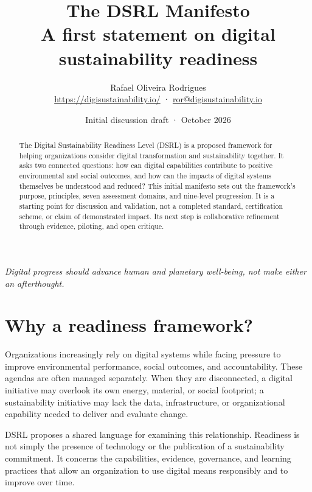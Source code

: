 \documentclass[11pt,a4paper]{article}
\title{\vspace{-1.4cm}\Huge\bfseries\color{dsrlgreen}The DSRL Manifesto\\[0.4em]
\Large\normalfont\color{black}A first statement on digital sustainability readiness}
\author{Rafael Oliveira Rodrigues\\\small \url{https://digisustainability.io/} · \href{mailto:ror@digisustainability.io}{ror@digisustainability.io}}
\date{\small Initial discussion draft · October 2026}
\begin{document}
\maketitle
\begin{center}
\color{dsrlblue}\large\itshape Digital progress should advance human and planetary well-being, not make either an afterthought.
\end{center}
\vspace{0.4cm}

\begin{abstract}
The Digital Sustainability Readiness Level (DSRL) is a proposed framework for helping organizations consider digital transformation and sustainability together. It asks two connected questions: how can digital capabilities contribute to positive environmental and social outcomes, and how can the impacts of digital systems themselves be understood and reduced? This initial manifesto sets out the framework's purpose, principles, seven assessment domains, and nine-level progression. It is a starting point for discussion and validation, not a completed standard, certification scheme, or claim of demonstrated impact. Its next step is collaborative refinement through evidence, piloting, and open critique.
\end{abstract}

\section*{Why a readiness framework?}
Organizations increasingly rely on digital systems while facing pressure to improve environmental performance, social outcomes, and accountability. These agendas are often managed separately. When they are disconnected, a digital initiative may overlook its own energy, material, or social footprint; a sustainability initiative may lack the data, infrastructure, or organizational capability needed to deliver and evaluate change.

DSRL proposes a shared language for examining this relationship. Readiness is not simply the presence of technology or the publication of a sustainability commitment. It concerns the capabilities, evidence, governance, and learning practices that allow an organization to use digital means responsibly and to improve over time.
\end{document}
